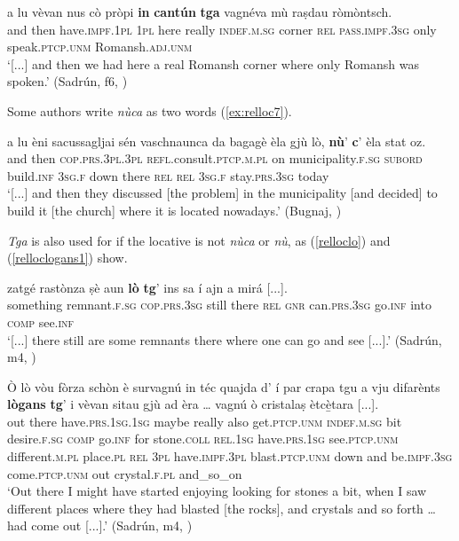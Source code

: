 \ea
\label{ex:relloc6}
\gll [...] a lu vèvan nus cò pròpi \textbf{in} \textbf{cantún} \textbf{tga} vagnéva mù raṣdau ròmòntsch.\\
{} and then have.\textsc{impf.1pl} \textsc{1pl} here really \textsc{indef.m.sg} corner \textsc{rel} \textsc{pass.impf.3sg} only speak.\textsc{ptcp.unm} Romansh.\textsc{adj.unm} \\
\glt `[...] and then we had here a real Romansh corner where only Romansh was spoken.' (Sadrún, f6, )
\z

Some authors write \textit{nùca} as two words (\ref{ex:relloc7}).

\ea\label{ex:relloc7}
\gll    [...] a lu èni sacussagljai sén vaschnaunca da bagagè èla gjù lò, \textbf{nù}' \textbf{c}' èla stat oz. \\
     {} and then \textsc{cop.prs.3pl.3pl} \textsc{refl}.consult.\textsc{ptcp.m.pl} on municipality.\textsc{f.sg} \textsc{subord} build.\textsc{inf} \textsc{3sg.f} down there \textsc{rel} \textsc{rel} \textsc{3sg.f} stay.\textsc{prs.3sg} today\\
\glt `[...] and then they discussed [the problem] in the municipality [and decided] to build it [the church] where it is located nowadays.' (Bugnaj, \citealt[134]{Büchli1966})
\z

\textit{Tga} is also used for  if the locative  is not \textit{nùca} or \textit{nù}, as (\ref{relloclo}) and (\ref{relloclogans1}) show.

\ea
\label{relloclo}
\gll [...] zatgé rastònza ṣè aun \textbf{lò} \textbf{tg}’ ins sa í ajn a mirá [...].\\
 {} something remnant.\textsc{f.sg} \textsc{cop.prs.3sg} still there \textsc{rel} \textsc{gnr} can.\textsc{prs.3sg} go.\textsc{inf} into \textsc{comp} see.\textsc{inf}\\
\glt `[...] there still are some remnants there where one can go and see [...].' (Sadrún, m4, )
\z

\ea
\label{relloclogans1}
\gll  Ò lò vòu fòrza schòn è survagnú in téc quajda d' í par crapa tgu a vju difarènts \textbf{lògans} \textbf{tg}’ i vèvan sitau gjù ad èra … vagnú ò cristalaṣ ètc{\`e̱}tara [...].   \\
out there  have.\textsc{prs.1sg.1sg} maybe really also get.\textsc{ptcp.unm} \textsc{indef.m.sg} bit desire.\textsc{f.sg} \textsc{comp} go.\textsc{inf} for stone.\textsc{coll} \textsc{rel.1sg} have.\textsc{prs.1sg} see.\textsc{ptcp.unm} different.\textsc{m.pl} place.\textsc{pl} \textsc{rel} \textsc{3pl} have.\textsc{impf.3pl} blast.\textsc{ptcp.unm} down and  be.\textsc{impf.3sg} {} come.\textsc{ptcp.unm} out crystal.\textsc{f.pl} and\_so\_on \\
\glt `Out there I might have started enjoying looking for stones a bit, when I saw different places where they had blasted [the rocks], and crystals and so forth … had come out [...].' (Sadrún, m4, )
\z

